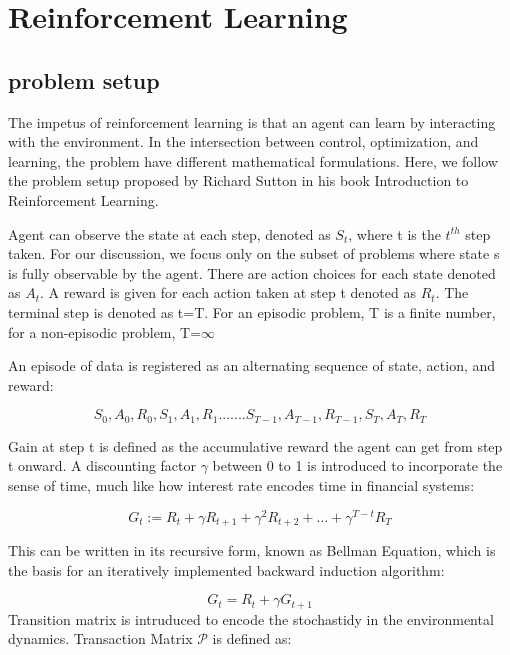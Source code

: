 \documentclass[journal]{IEEEtran}
\begin{document}
\section{Reinforcement Learning}


\subsection{problem setup}
The impetus of reinforcement learning is that an agent can learn by interacting with the environment. In the intersection between control, optimization, and learning, the problem have different mathematical formulations. Here, we follow the problem setup proposed by Richard Sutton in his book Introduction to Reinforcement Learning. \cite{10.5555/551283}

Agent can observe the state at each step, denoted as $ S_{t} $, where t is the $t^{th}$ step taken. For our discussion, we focus only on the subset of problems where state s is fully observable by the agent. There are action choices for each state denoted as $ A_{t} $. A reward is given for each action taken at step t denoted as $ R_{t} $. The terminal step is denoted as t=T. For an episodic problem, T is a finite number, for a non-episodic problem, T=$\infty$

An episode of data is registered as an alternating sequence of state, action, and reward:

$$ S_{0}, A_{0}, R_{0}, S_{1}, A_{1}, R_{1}.......S_{T-1},A_{T-1},R_{T-1},S_{T},A_{T},R_{T} $$

Gain at step t is defined as the accumulative reward the agent can get from step t onward. A discounting factor $\gamma$ between 0 to 1 is introduced to incorporate the sense of time, much like how interest rate encodes time in financial systems:

\begin{equation}
G_{t} := R_{t}+\gamma R_{t+1}+\gamma ^2 R_{t+2}+...+\gamma^{T-t}R_{T}
\end{equation}


This can be written in its recursive form, known as Bellman Equation, which is the basis for an iteratively implemented backward induction algorithm:

\begin{equation}
        G_{t}=R_{t}+\gamma G_{t+1}
    \label{bellman}
\end{equation}
Transition matrix is intruduced to encode the stochastidy in the environmental dynamics. Transaction Matrix $\mathcal{P}$ is defined as:
\end{document}
